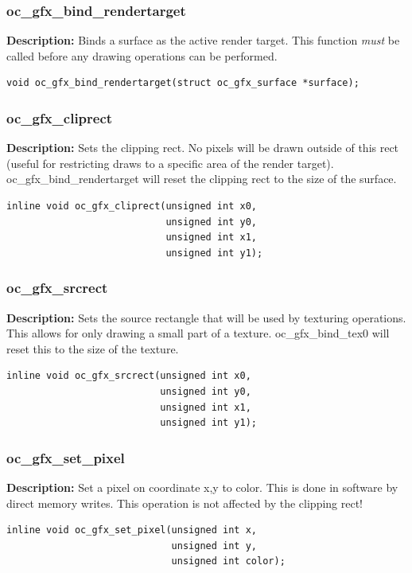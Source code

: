 \documentclass[10pt,a4paper]{article}
\begin{document}
\subsubsection{oc\_gfx\_bind\_rendertarget}
\textbf{Description:} Binds a surface as the active render target. This function \textit{must} be called before any drawing operations can be performed.
\begin{lstlisting}
void oc_gfx_bind_rendertarget(struct oc_gfx_surface *surface);
\end{lstlisting}

\subsubsection{oc\_gfx\_cliprect}
\textbf{Description:} Sets the clipping rect. No pixels will be drawn outside of this rect (useful for restricting draws to a specific area of the render target). oc\_gfx\_bind\_rendertarget will reset the clipping rect to the size of the surface.
\begin{lstlisting}
inline void oc_gfx_cliprect(unsigned int x0,
                            unsigned int y0,
                            unsigned int x1,
                            unsigned int y1);
\end{lstlisting}

\subsubsection{oc\_gfx\_srcrect}
\textbf{Description:} Sets the source rectangle that will be used by texturing operations. This allows for only drawing a small part of a texture. oc\_gfx\_bind\_tex0 will reset this to the size of the texture.
\begin{lstlisting}
inline void oc_gfx_srcrect(unsigned int x0,
                           unsigned int y0,
                           unsigned int x1,
                           unsigned int y1);
\end{lstlisting}

\subsubsection{oc\_gfx\_set\_pixel}
\textbf{Description:} Set a pixel on coordinate x,y to color. This is done in software by direct memory writes. This operation is not affected by the clipping rect!
\begin{lstlisting}
inline void oc_gfx_set_pixel(unsigned int x, 
                             unsigned int y, 
                             unsigned int color);
\end{lstlisting}
\end{document}
